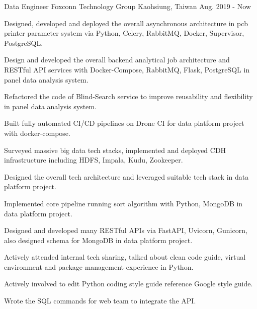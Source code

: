 

\begin{cventries}

  \cventry
    {Data Engineer} %
    {Foxconn Technology Group} %
    {Kaohsiung, Taiwan} %
    {Aug. 2019 - Now} %
    {
      \begin{cvitems} %
        \item {Designed, developed and deployed the overall asynchronous architecture in pcb printer parameter system via Python, Celery, RabbitMQ, Docker, Supervisor, PostgreSQL.}
        \item {Design and developed the overall backend analytical job architecture and RESTful API services with Docker-Compose, RabbitMQ, Flask, PostgreSQL in panel data analysis system.}
        \item {Refactored the code of Blind-Search service to improve reusability and flexibility in panel data analysis system.}
        \item {Built fully automated CI/CD pipelines on Drone CI for data platform project with docker-compose.}
        \item {Surveyed massive big data tech stacks, implemented and deployed CDH infrastructure including HDFS, Impala, Kudu, Zookeeper.}
        \item {Designed the overall tech architecture and leveraged suitable tech stack in data platform project.}
        \item {Implemented core pipeline running sort algorithm with Python, MongoDB in data platform project.}
        \item {Designed and developed many RESTful APIs via FastAPI, Uvicorn, Gunicorn, also designed schema for MongoDB in data platform project.}
        \item {Actively attended internal tech sharing, talked about clean code guide, virtual environment and package management experience in Python.}
        \item {Actively involved to edit Python coding style guide reference Google style guide.}
        \item {Wrote the SQL commands for web team to integrate the API.}
      \end{cvitems}
    }


\end{cventries}
